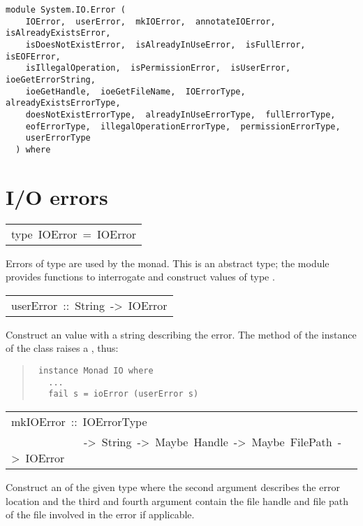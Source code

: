 \label{module:System.IO.Error}
\haddockbeginheader
{\haddockverb\begin{verbatim}
module System.IO.Error (
    IOError,  userError,  mkIOError,  annotateIOError,  isAlreadyExistsError, 
    isDoesNotExistError,  isAlreadyInUseError,  isFullError,  isEOFError, 
    isIllegalOperation,  isPermissionError,  isUserError,  ioeGetErrorString, 
    ioeGetHandle,  ioeGetFileName,  IOErrorType,  alreadyExistsErrorType, 
    doesNotExistErrorType,  alreadyInUseErrorType,  fullErrorType, 
    eofErrorType,  illegalOperationErrorType,  permissionErrorType, 
    userErrorType
  ) where\end{verbatim}}
\haddockendheader

\section{I/O errors
}
\begin{haddockdesc}
\item[\begin{tabular}{@{}l}
type\ IOError\ =\ IOError
\end{tabular}]\haddockbegindoc
Errors of type  are used by the  monad.  This is an
 abstract type; the module  provides functions to
 interrogate and construct values of type .
\par

\end{haddockdesc}
\begin{haddockdesc}
\item[\begin{tabular}{@{}l}
userError\ ::\ String\ ->\ IOError
\end{tabular}]\haddockbegindoc
Construct an  value with a string describing the error.
 The  method of the  instance of the  class raises a
 , thus:
\par
\begin{quote}
{\haddockverb\begin{verbatim}
 instance Monad IO where 
   ...
   fail s = ioError (userError s)
\end{verbatim}}
\end{quote}

\end{haddockdesc}
\begin{haddockdesc}
\item[\begin{tabular}{@{}l}
mkIOError\ ::\ IOErrorType\\\ \ \ \ \ \ \ \ \ \ \ \ \ ->\ String\ ->\ Maybe\ Handle\ ->\ Maybe\ FilePath\ ->\ IOError
\end{tabular}]\haddockbegindoc
Construct an  of the given type where the second argument
 describes the error location and the third and fourth argument
 contain the file handle and file path of the file involved in the
 error if applicable.
\par

\end{haddockdesc}
